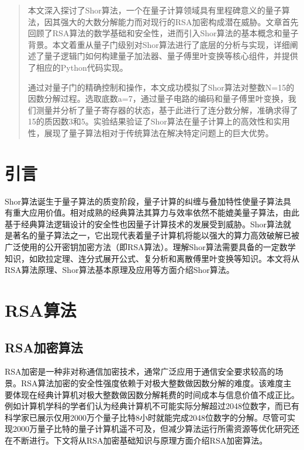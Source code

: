 \documentclass[12pt,hyperref,a4paper,UTF8]{ctexart}
\begin{document}
\cover

\begin{abstract}
    本文深入探讨了Shor算法，一个在量子计算领域具有里程碑意义的量子算法，因其强大的大数分解能力而对现行的RSA加密构成潜在威胁。文章首先回顾了RSA算法的数学基础和安全性，进而引入Shor算法的基本概念和量子背景。本文着重从量子门级别对Shor算法进行了底层的分析与实现，详细阐述了量子逻辑门如何构建量子加法器、量子傅里叶变换等核心组件，并提供了相应的Python代码实现。

    通过对量子门的精确控制和操作，本文成功模拟了Shor算法对整数N=15的因数分解过程。选取底数a=7，通过量子电路的编码和量子傅里叶变换，我们测量并分析了量子寄存器的状态，基于此进行了连分数分解，准确求得了15的质因数3和5。实验结果验证了Shor算法在量子计算上的高效性和实用性，展现了量子算法相对于传统算法在解决特定问题上的巨大优势。
\end{abstract}

\thispagestyle{empty} %

\newpage
\tableofcontents

\newpage
\section{引言}
Shor算法诞生于量子算法的质变阶段，量子计算的纠缠与叠加特性使量子算法具有重大应用价值。相对成熟的经典算法其算力与效率依然不能媲美量子算法，由此基于经典算法逻辑设计的安全性也因量子计算技术的发展受到威胁。Shor算法就是著名的量子算法之一，它出现代表着量子计算机将能以强大的算力高效破解已被广泛使用的公开密钥加密方法（即RSA算法）。理解Shor算法需要具备的一定数学知识，如欧拉定理、连分式展开公式、复分析和离散傅里叶变换等知识。本文将从RSA算法原理、Shor算法基本原理及应用等方面介绍Shor算法。

\section{RSA算法}
\subsection{RSA加密算法}
RSA加密是一种非对称通信加密技术，通常广泛应用于通信安全要求较高的场景。RSA算法加密的安全性强度依赖于对极大整数做因数分解的难度。该难度主要体现在经典计算机对极大整数做因数分解耗费的时间成本与信息价值不成正比。例如计算机学科的学者们认为经典计算机不可能实际分解超过2048位数字，而已有科学家已展示仅用2000万个量子比特8小时就能完成2048位数字的分解。尽管可实现2000万量子比特的量子计算机遥不可及，但减少算法运行所需资源等优化研究还在不断进行。下文将从RSA加密基础知识与原理方面介绍RSA加密算法。
\end{document}
